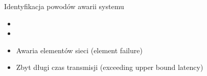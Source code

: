 \documentclass[compress,red]{beamer}
\begin{document}
\begin{frame}{Identyfikacja powodów awarii systemu}


  \begin{itemize}
    \item \color{red}{Przekłamanie danych (bit errors)}
    \item \color{black}{Przeciążenie sieci (congestion)}
    \item Awaria elementów sieci (element failure)
    \item Zbyt długi czas transmisji (exceeding upper bound latency)
  \end{itemize}

\end{frame}
\end{document}
